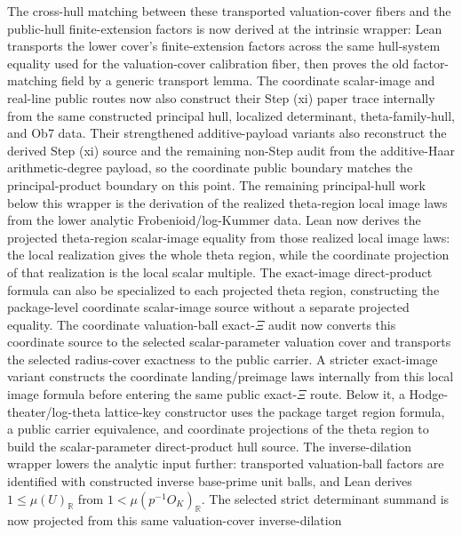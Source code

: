 \begin{proposition}
  The cross-hull matching between these transported
  valuation-cover
  fibers and the public-hull finite-extension factors is now derived at the
  intrinsic wrapper: Lean transports the lower cover's finite-extension
  factors across the same hull-system equality used for the valuation-cover
  calibration fiber, then proves the old factor-matching field by a generic
  transport lemma.  The coordinate scalar-image and real-line public routes
  now also construct their Step (xi) paper trace internally from the same
  constructed principal hull, localized determinant, theta-family-hull, and
  Ob7 data.  Their strengthened additive-payload variants also reconstruct
  the derived Step (xi) source and the remaining non-Step audit from the
  additive-Haar arithmetic-degree payload, so the coordinate public boundary
  matches the principal-product boundary on this point.  The remaining
  principal-hull work below this wrapper is the
  derivation of the realized theta-region local image laws from the lower
  analytic Frobenioid/log-Kummer data.  Lean now derives the projected
  theta-region scalar-image equality from those realized local image laws:
  the local realization gives the whole theta region, while the coordinate
  projection of that realization is the local scalar multiple.  The exact-image
  direct-product formula can also be specialized to each projected theta
  region, constructing the package-level coordinate scalar-image source
  without a separate projected equality.  The coordinate valuation-ball
  exact-\(\Xi\) audit now converts this coordinate source to the selected
  scalar-parameter valuation cover and transports the selected radius-cover
  exactness to the public carrier.  A stricter exact-image variant constructs
  the coordinate landing/preimage laws internally from this local image formula
  before entering the same public exact-\(\Xi\) route.  Below it, a
  Hodge-theater/log-theta lattice-key constructor uses the package target
  region formula, a public carrier equivalence, and coordinate projections of
  the theta region to build the scalar-parameter direct-product hull source.
  The
  inverse-dilation wrapper lowers the analytic input further: transported
  valuation-ball factors are identified with constructed inverse base-prime
  unit balls, and Lean derives \(1 \leq \mu(U)_{\mathbb{R}}\) from
  \(1 < \mu(p^{-1}O_K)_{\mathbb{R}}\).  The selected strict determinant
  summand is now projected from this same valuation-cover inverse-dilation

\end{proposition}
